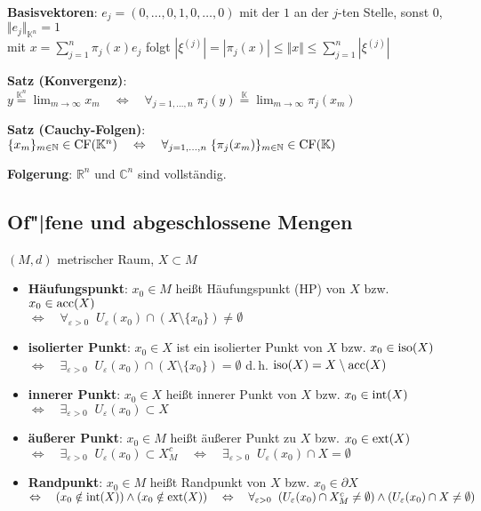 \textbf{Basisvektoren}: $e_j = (0, \ldots, 0, 1, 0, \ldots, 0)$ mit der $1$
an der $j$-ten Stelle, sonst $0$, $\Vert e_j \Vert_{\mathbb{K}^n} = 1$ \\
mit $x = \sum_{j=1}^n \pi_j(x) e_j$ folgt
$|\xi^{(j)}| = |\pi_j(x)| \le \Vert x \Vert \le \sum_{j=1}^n |\xi^{(j)}|$

\textbf{Satz (Konvergenz)}:
$y \overset{\mathbb{K}^n}{=} \lim_{m \to \infty} x_m \quad\Leftrightarrow\quad
\forall_{j=1,\ldots,n}\; \pi_j(y) \overset{\mathbb{K}}{=}
\lim_{m \to \infty} \pi_j(x_m)$

\textbf{Satz (Cauchy-Folgen)}:
$\{x_m\}_{m \in \mathbb{N}} \in \operatorname{CF}(\mathbb{K}^n)
\quad\Leftrightarrow\quad
\forall_{j=1,\ldots,n}\; \{\pi_j(x_m)\}_{m \in \mathbb{N}} \in
\operatorname{CF}(\mathbb{K})$

\textbf{Folgerung}: $\mathbb{R}^n$ und $\mathbb{C}^n$ sind vollständig.

\subsection{%
    Of"|fene und abgeschlossene Mengen%
}

$(M,d)$ metrischer Raum, $X \subset M$

\begin{itemize}
    \item \textbf{Häufungspunkt}:
    $x_0 \in M$ heißt Häufungspunkt (HP) von $X$ bzw. $x_0 \in \operatorname{acc}(X)$ \\
    $\Leftrightarrow\quad \forall_{\varepsilon > 0}\;\;
    U_\varepsilon(x_0) \cap (X \setminus \{x_0\}) \not= \emptyset$
    
    \item \textbf{isolierter Punkt}:
    $x_0 \in X$ ist ein isolierter Punkt von $X$ bzw. $x_0 \in \operatorname{iso}(X)$ \\
    $\Leftrightarrow\quad \exists_{\varepsilon > 0}\;\;
    U_\varepsilon(x_0) \cap (X \setminus \{x_0\}) = \emptyset$
    \qquad d.\,h. $\operatorname{iso}(X) = X \setminus \operatorname{acc}(X)$
    
    \item \textbf{innerer Punkt}:
    $x_0 \in X$ heißt innerer Punkt von $X$ bzw. $x_0 \in \operatorname{int}(X)$ \\
    $\Leftrightarrow\quad
    \exists_{\varepsilon > 0}\;\; U_\varepsilon(x_0) \subset X$
    
    \item \textbf{äußerer Punkt}:
    $x_0 \in M$ heißt äußerer Punkt zu $X$ bzw. $x_0 \in \operatorname{ext}(X)$ \\
    $\Leftrightarrow\quad
    \exists_{\varepsilon > 0}\;\; U_\varepsilon(x_0) \subset X_M^c
    \quad\Leftrightarrow\quad
    \exists_{\varepsilon > 0}\;\; U_\varepsilon(x_0) \cap X = \emptyset$
    
    \item \textbf{Randpunkt}:
    $x_0 \in M$ heißt Randpunkt von $X$ bzw. $x_0 \in \partial X$ \\
    $\Leftrightarrow\quad
    (x_0 \notin \operatorname{int}(X)) \land (x_0 \notin \operatorname{ext}(X))
    \quad\Leftrightarrow\quad \forall_{\varepsilon > 0}\;\;
    (U_\varepsilon(x_0) \cap X_M^c \not= \emptyset) \land
    (U_\varepsilon(x_0) \cap X \not= \emptyset)$
\end{itemize}

